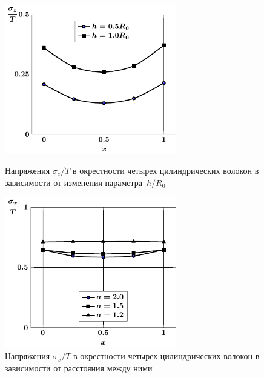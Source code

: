 %

\begin{figure}[h!]
\centering\footnotesize
\parbox[b]{7.5cm}{\centering\includegraphics[width=7.5cm]{inclusion-4-z-h.pdf}
\caption{Напряжения $\sigma_z/T$ в окрестности четырех цилиндрических волокон в зависимости от изменения параметра~$h/R_0$
\label{f:7:54}}}\hfil\hfil
\parbox[b]{7.5cm}{\centering\includegraphics[width=7.5cm]{inclusion-4-x-a.pdf}
\caption{Напряжения $\sigma_x/T$ в окрестности четырех цилиндрических волокон в зависимости от расстояния между ними
\label{f:7:55}}}
\end{figure}

%

